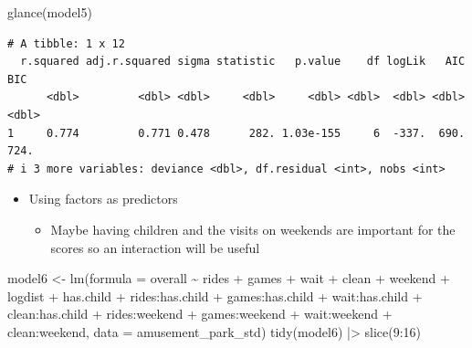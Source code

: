 \documentclass[
  ignorenonframetext,
]{beamer}
\newenvironment{Shaded}{\begin{snugshade}}{\end{snugshade}}
\newcommand{\AttributeTok}[1]{\textcolor[rgb]{0.40,0.45,0.13}{#1}}
\newcommand{\DecValTok}[1]{\textcolor[rgb]{0.68,0.00,0.00}{#1}}
\newcommand{\FunctionTok}[1]{\textcolor[rgb]{0.28,0.35,0.67}{#1}}
\newcommand{\NormalTok}[1]{\textcolor[rgb]{0.00,0.23,0.31}{#1}}
\newcommand{\OtherTok}[1]{\textcolor[rgb]{0.00,0.23,0.31}{#1}}
\newcommand{\SpecialCharTok}[1]{\textcolor[rgb]{0.37,0.37,0.37}{#1}}
\providecommand{\tightlist}{%
  \setlength{\itemsep}{0pt}\setlength{\parskip}{0pt}}\usepackage{longtable,booktabs,array}
\begin{document}
\begin{frame}[fragile]{}
\begin{Shaded}
\begin{Highlighting}[]
\FunctionTok{glance}\NormalTok{(model5)}
\end{Highlighting}
\end{Shaded}

\begin{verbatim}
# A tibble: 1 x 12
  r.squared adj.r.squared sigma statistic   p.value    df logLik   AIC   BIC
      <dbl>         <dbl> <dbl>     <dbl>     <dbl> <dbl>  <dbl> <dbl> <dbl>
1     0.774         0.771 0.478      282. 1.03e-155     6  -337.  690.  724.
# i 3 more variables: deviance <dbl>, df.residual <int>, nobs <int>
\end{verbatim}
\end{frame}

\begin{frame}[fragile]{}
\label{section-39}
\begin{itemize}
\item
  Using factors as predictors

  \begin{itemize}
  \tightlist
  \item
    Maybe having children and the visits on weekends are important for
    the scores so an interaction will be useful
  \end{itemize}
\end{itemize}

\tiny

\begin{Shaded}
\begin{Highlighting}[]
\NormalTok{model6 }\OtherTok{\textless{}{-}} \FunctionTok{lm}\NormalTok{(}\AttributeTok{formula =}\NormalTok{ overall }\SpecialCharTok{\textasciitilde{}}\NormalTok{ rides }\SpecialCharTok{+}\NormalTok{ games }\SpecialCharTok{+}\NormalTok{ wait }\SpecialCharTok{+}\NormalTok{ clean }\SpecialCharTok{+}\NormalTok{ weekend }\SpecialCharTok{+}\NormalTok{ logdist }\SpecialCharTok{+} 
\NormalTok{                                 has.child }\SpecialCharTok{+}\NormalTok{ rides}\SpecialCharTok{:}\NormalTok{has.child }\SpecialCharTok{+}\NormalTok{ games}\SpecialCharTok{:}\NormalTok{has.child }\SpecialCharTok{+}\NormalTok{ wait}\SpecialCharTok{:}\NormalTok{has.child }\SpecialCharTok{+} 
\NormalTok{                                 clean}\SpecialCharTok{:}\NormalTok{has.child }\SpecialCharTok{+}\NormalTok{ rides}\SpecialCharTok{:}\NormalTok{weekend }\SpecialCharTok{+}\NormalTok{ games}\SpecialCharTok{:}\NormalTok{weekend }\SpecialCharTok{+}\NormalTok{ wait}\SpecialCharTok{:}\NormalTok{weekend }\SpecialCharTok{+} 
\NormalTok{                                 clean}\SpecialCharTok{:}\NormalTok{weekend, }\AttributeTok{data =}\NormalTok{ amusement\_park\_std)}
\FunctionTok{tidy}\NormalTok{(model6) }\SpecialCharTok{|\textgreater{}} \FunctionTok{slice}\NormalTok{(}\DecValTok{9}\SpecialCharTok{:}\DecValTok{16}\NormalTok{)}
\end{Highlighting}
\end{Shaded}


\end{frame}
\end{document}

